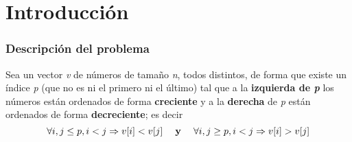 \section[Introducción]{Introducción}
\begin{frame}[plain]
	\frametitle{Descripción del problema}
	
	
	\begin{defn}
	Sea un vector \textit{v} de números de tamaño \textit{n}, todos distintos, de forma que existe un índice \textit{p} (que no es ni el primero ni el último) tal que a la \textbf{izquierda de 	\textit{p} } los números están ordenados de forma \textbf{creciente} y a la \textbf{derecha} de \textit{p} están ordenados de forma \textbf{decreciente}; es decir \\
	
		\begin{equation}
			 \forall i,j \leq p, i < j \Rightarrow v[i] < v[j]  \hspace*{0.18in} \textbf{y} \hspace*{0.18in}  \forall i,j \geq p, i < j \Rightarrow v[i] > v[j] 
		\end{equation}
		\vspace*{0.05in}
		
	\end{defn}
\end{frame}
	
	


%
	
	
%
%		
%		
%		


	
